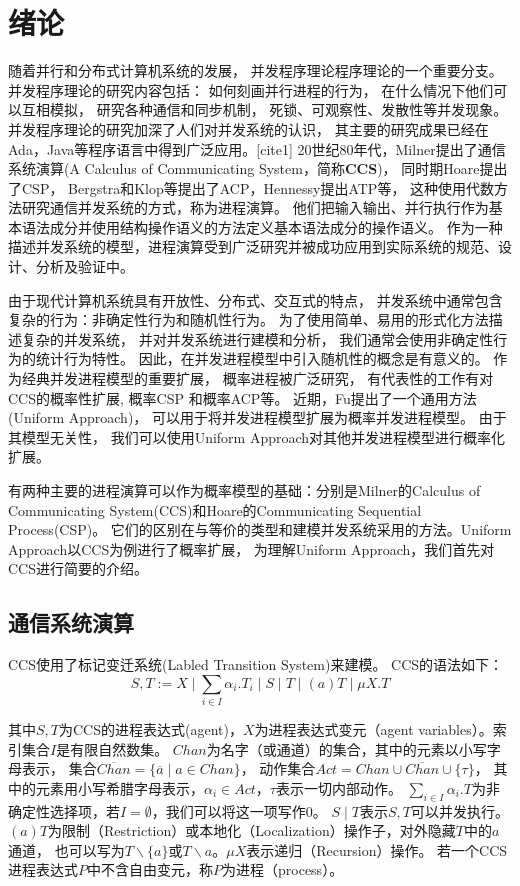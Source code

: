 
\chapter{绪论}\label{ch:intro}

随着并行和分布式计算机系统的发展，
  并发程序理论程序理论的一个重要分支。
  并发程序理论的研究内容包括：
  如何刻画并行进程的行为，
  在什么情况下他们可以互相模拟，
  研究各种通信和同步机制，
  死锁、可观察性、发散性等并发现象。
  并发程序理论的研究加深了人们对并发系统的认识，
  其主要的研究成果已经在Ada，Java等程序语言中得到广泛应用。[cite1]
  20世纪80年代，Milner提出了通信系统演算(A Calculus of Communicating System，简称\textbf{CCS})\cite{2}，
   同时期Hoare提出了CSP\cite{3}，
   Bergstra和Klop等提出了ACP\cite{4}，Hennessy提出ATP\cite{5}等，
   这种使用代数方法研究通信并发系统的方式，称为进程演算。
   他们把输入输出、并行执行作为基本语法成分并使用结构操作语义的方法定义基本语法成分的操作语义。
   作为一种描述并发系统的模型，进程演算受到广泛研究并被成功应用到实际系统的规范、设计、分析及验证中。

由于现代计算机系统具有开放性、分布式、交互式的特点，
并发系统中通常包含复杂的行为：非确定性行为和随机性行为。
为了使用简单、易用的形式化方法描述复杂的并发系统，
并对并发系统进行建模和分析，
我们通常会使用非确定性行为的统计行为特性。
因此，在并发进程模型中引入随机性的概念是有意义的。
作为经典并发进程模型的重要扩展，
概率进程被广泛研究，
有代表性的工作有对CCS的概率性扩展\cite{9,10},
概率CSP\cite{11} 和概率ACP\cite{12}等。
近期，Fu提出了一个通用方法(Uniform Approach)，
可以用于将并发进程模型扩展为概率并发进程模型。
由于其模型无关性，
我们可以使用Uniform Approach对其他并发进程模型进行概率化扩展。

有两种主要的进程演算可以作为概率模型的基础：分别是Milner的Calculus of Communicating System(CCS)和Hoare的Communicating Sequential Process(CSP)。
  它们的区别在与等价的类型和建模并发系统采用的方法。Uniform Approach以CCS为例进行了概率扩展，
  为理解Uniform Approach，我们首先对CCS进行简要的介绍。

\section{通信系统演算}

   CCS使用了标记变迁系统(Labled Transition System)来建模。
   CCS的语法如下：
   $$S,T:=X\mid \sum_{i\in I}\alpha_i.T_i\mid S\mid T \mid (a)T \mid \mu X.T$$

   其中$S,T$为CCS的进程表达式(agent)，$X$为进程表达式变元（agent variables）。索引集合$I$是有限自然数集。
   $Chan$为名字（或通道）的集合，其中的元素以小写字母表示，
   集合$\overline{Chan}=\{\overline{a}\mid a\in Chan\}$，
   动作集合$Act=Chan\cup \overline{Chan}\cup \{\tau\} $，
   其中的元素用小写希腊字母表示，$\alpha_i\in Act$，$\tau$表示一切内部动作。
   $\sum_{i\in I}\alpha_i.T$为非确定性选择项，若$I=\emptyset$，我们可以将这一项写作$0$。
   $S\mid T$表示$S,T$可以并发执行。$(a)T$为限制（Restriction）或本地化（Localization）操作子，对外隐藏$T$中的$a$通道，
   也可以写为$T\backslash \{a\}$或$T\backslash a$。$\mu X$表示递归（Recursion）操作。
   若一个CCS进程表达式$P$中不含自由变元，称$P$为进程（process）。

